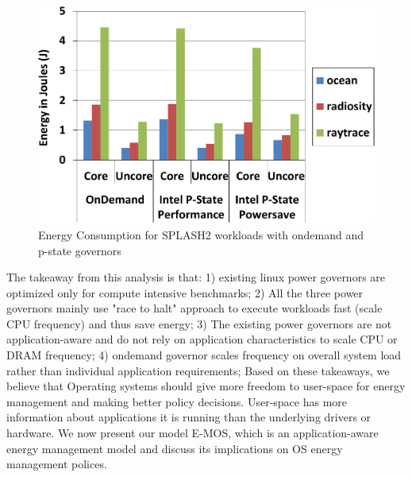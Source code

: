 \begin{figure}[h]
  \begin{center}
\includegraphics[width=\linewidth]{figs/def-drivers-splash-crop.pdf}
  \end{center}
  \vspace{-0.1in}
  \caption{Energy Consumption for SPLASH2 workloads with ondemand and p-state governors}
  \label{fig:splash-energy}
\end{figure}

\vspace{-0.1in}
The takeaway from this analysis is that: 1) existing linux power governors 
are optimized only for compute intensive benchmarks;
2) All the three power governors mainly use "race to halt" approach to execute workloads 
fast (scale CPU frequency) and thus save energy;
3) The existing power governors are not application-aware and do not rely
on application characteristics to scale CPU or DRAM frequency;
4) ondemand governor scales frequency on overall system load
rather than individual application requirements;
Based on these takeaways, we believe that Operating systems
should give more freedom to user-space for energy management
and making better policy decisions. User-space has more 
information about applications it is running than
the underlying drivers or hardware.
We now present our model E-MOS, which is an application-aware
energy management model and discuss its implications on OS energy management polices.
